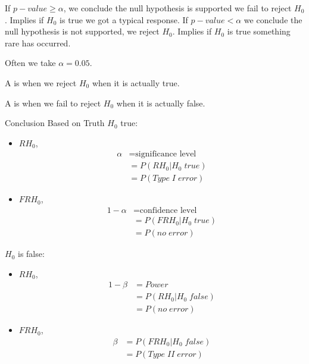 \documentclass[12pt, a4paper, twoside, openright, titlepage]{book}
\begin{document}
If $p-value \geq \alpha$, we conclude the null hypothesis is supported we fail to reject $H_0$. Implies if $H_0$ is true we got a typical response. If $p-value < \alpha$ we conclude the null hypothesis is not supported, we reject $H_0$. Implies if $H_0$ is true something rare has occurred.

Often we take $\alpha = 0.05$.

\begin{defn}{}{}
    A  is when we reject $H_0$ when it is actually true.
\end{defn}

\begin{defn}{}{}
    A  is when we fail to reject $H_0$ when it is actually false.
\end{defn}

\begin{rmk}{Conclusion Based on Truth}{}
    $H_0$ true: \begin{itemize}
        \item $RH_0$, \begin{align*}
                \alpha &= \text{significance level} \\
                &= P(RH_0\vert H_0\;true) \\
                &= P(Type\;I\;error) 
        \end{align*}
    \item $FRH_0$, \begin{align*}
            1-\alpha &= \text{confidence level} \\
            &= P(FRH_0\vert H_0\;true) \\
            &= P(no\;error)
    \end{align*}
    \end{itemize}
    $H_0$ is false: \begin{itemize}
        \item $RH_0$, \begin{align*}
                1-\beta &= Power \\
                &= P(RH_0\vert H_0\;false) \\
                &= P(no \; error)
            \end{align*}
        \item $FRH_0$, \begin{align*}
                \beta &= P(FRH_0\vert H_0\;false) \\
                &= P(Type\;II\;error)
        \end{align*}
    \end{itemize}
\end{rmk}
\end{document}
